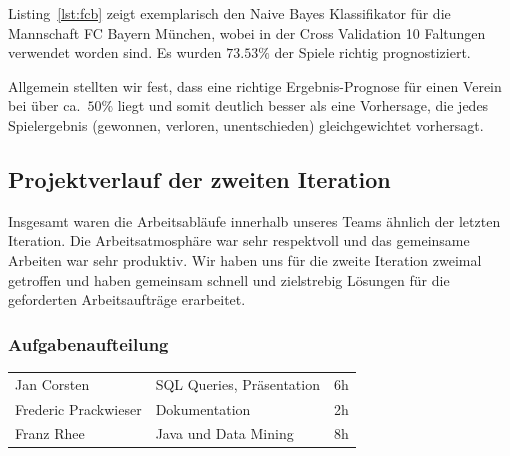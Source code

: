\documentclass[
10pt,
a4paper
]{scrartcl}
\begin{document}
Listing~\ref{lst:fcb} zeigt exemplarisch den Naive Bayes Klassifikator für die Mannschaft FC Bayern München, wobei in der Cross Validation 10 Faltungen verwendet worden sind. 
Es wurden $73.53\%$ der Spiele richtig prognostiziert.



Allgemein stellten wir fest, dass eine richtige Ergebnis-Prognose für einen Verein bei über ca.~$50\%$ liegt und somit deutlich besser als eine Vorhersage, die jedes Spielergebnis (gewonnen, verloren, unentschieden) gleichgewichtet vorhersagt.


\subsection{Projektverlauf der zweiten Iteration}

Insgesamt waren die Arbeitsabläufe innerhalb unseres Teams ähnlich der letzten Iteration. Die Arbeitsatmosphäre war sehr respektvoll und das gemeinsame Arbeiten war sehr produktiv. Wir haben uns für die zweite Iteration zweimal getroffen und haben gemeinsam schnell und zielstrebig Lösungen für die geforderten Arbeitsaufträge erarbeitet.
 

\subsubsection{Aufgabenaufteilung}
\begin{tabular}{ l l c }
Jan Corsten & SQL Queries, Präsentation & 6h \\
Frederic Prackwieser & Dokumentation & 2h \\
Franz Rhee & Java und Data Mining & 8h \\
\end{tabular}
\end{document}
